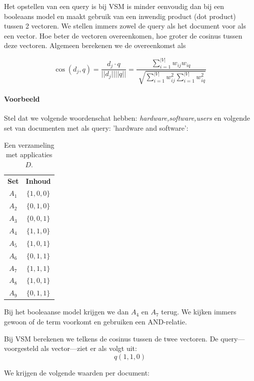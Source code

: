 Het opstellen van een query is bij VSM is minder eenvoudig dan bij een booleaans model en maakt gebruik van een inwendig product (dot product) tussen 2 vectoren. We stellen immers zowel de query  als het document voor als een vector. Hoe beter de vectoren overeenkomen, hoe groter de cosinus tussen deze vectoren. Algemeen berekenen we de overeenkomst als

\begin{equation}
\cos{\left(d_j,q\right)} = \frac{d_j \cdot q}{||d_j|| ||q||} =
\frac{\sum_{i=1}^{|V|}{w_{ij} w_{iq}}}{\sqrt[]{
\sum_{i=1}^{|V|}{ w_{ij}^2}
\sum_{i=1}^{|V|}{w_{iq}^2}
}}
\end{equation}

%
\paragraph{Voorbeeld}

Stel dat we volgende woordenschat hebben: \emph{hardware,software,users} en volgende set van documenten met als query: 'hardware and software':

\begin{table}[h]
\centering
\caption{Een verzameling met applicaties $D$.}
\label{tabel:sl_ex1}
\begin{tabular}{c|c}
\textbf{Set} & \textbf{Inhoud} \\
$A_1$ & $\{1,0,0\}$ \\
$A_2$ & $\{0,1,0\}$ \\
$A_3$ & $\{0,0,1\}$ \\
$A_4$ & $\{1,1,0\}$ \\
$A_5$ & $\{1,0,1\}$ \\
$A_6$ & $\{0,1,1\}$ \\
$A_7$ & $\{1,1,1\}$ \\
$A_8$ & $\{1,0,1\}$ \\
$A_9$ & $\{0,1,1\}$
\end{tabular}
\end{table}
%

Bij het booleaanse model krijgen we dan $A_4$ en $A_7$ terug. We kijken immers gewoon of de term voorkomt en gebruiken een AND-relatie. 

Bij VSM berekenen we telkens de cosinus tussen de twee vectoren. De query---voorgesteld als vector---ziet er als volgt uit: 
\begin{equation}
q(1,1,0)
\end{equation}

We krijgen de volgende waarden per document:

